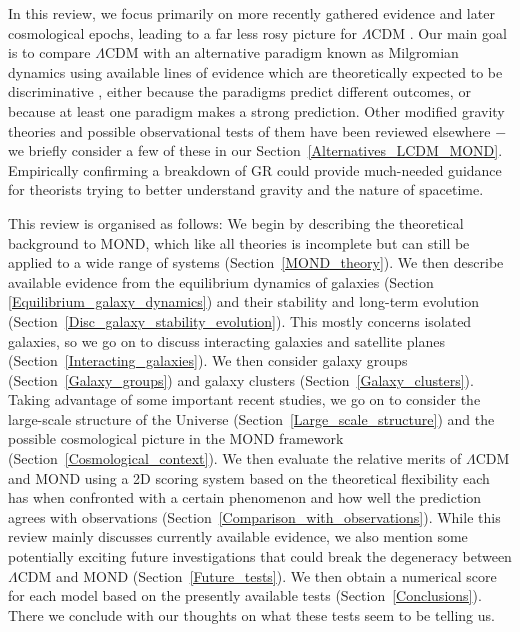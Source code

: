 \documentclass[fleqn,usenatbib,useAMS,onecolumn]{mnras} %
\begin{document}
In this review, we focus primarily on more recently gathered evidence and later cosmological epochs, leading to a far less rosy picture for $\Lambda$CDM \citep[serious problems with it are reviewed in][]{Kroupa_2010, Kroupa_2012, Kroupa_2015}. Our main goal is to compare $\Lambda$CDM with an alternative paradigm known as Milgromian dynamics \citep[MOND;][]{Milgrom_1983} using available lines of evidence which are theoretically expected to be discriminative \citep{Milgrom_1983_galaxies, Milgrom_1983_groups}, either because the paradigms predict different outcomes, or because at least one paradigm makes a strong prediction. Other modified gravity theories and possible observational tests of them have been reviewed elsewhere \citep[e.g.][]{Baker_2021} $-$ we briefly consider a few of these in our Section~\ref{Alternatives_LCDM_MOND}. Empirically confirming a breakdown of GR could provide much-needed guidance for theorists trying to better understand gravity and the nature of spacetime.

This review is organised as follows: We begin by describing the theoretical background to MOND, which like all theories is incomplete but can still be applied to a wide range of systems (Section~\ref{MOND_theory}). We then describe available evidence from the equilibrium dynamics of galaxies (Section \ref{Equilibrium_galaxy_dynamics}) and their stability and long-term evolution (Section~\ref{Disc_galaxy_stability_evolution}). This mostly concerns isolated galaxies, so we go on to discuss interacting galaxies and satellite planes (Section~\ref{Interacting_galaxies}). We then consider galaxy groups (Section~\ref{Galaxy_groups}) and galaxy clusters (Section~\ref{Galaxy_clusters}). Taking advantage of some important recent studies, we go on to consider the large-scale structure of the Universe (Section~\ref{Large_scale_structure}) and the possible cosmological picture in the MOND framework (Section~\ref{Cosmological_context}). We then evaluate the relative merits of $\Lambda$CDM and MOND using a 2D scoring system based on the theoretical flexibility each has when confronted with a certain phenomenon and how well the prediction agrees with observations (Section~\ref{Comparison_with_observations}). While this review mainly discusses currently available evidence, we also mention some potentially exciting future investigations that could break the degeneracy between $\Lambda$CDM and MOND (Section~\ref{Future_tests}). We then obtain a numerical score for each model based on the presently available tests (Section~\ref{Conclusions}). There we conclude with our thoughts on what these tests seem to be telling us.
\end{document}
